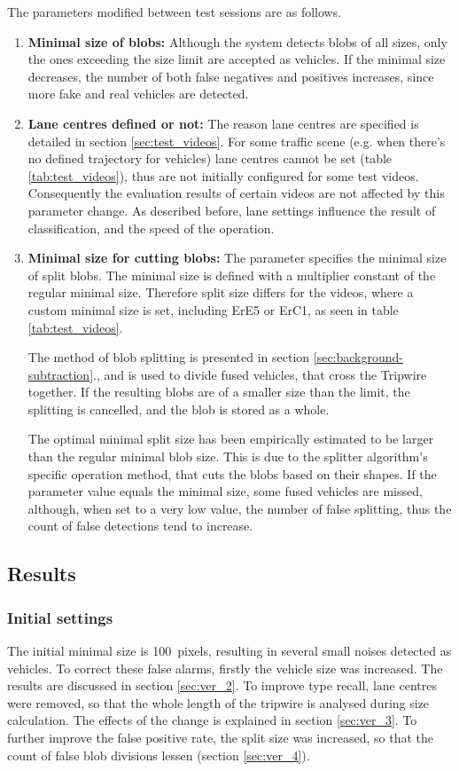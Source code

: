 \noindent The parameters modified between test sessions are as follows.
\begin{enumerate}
	\item \textbf{Minimal size of blobs:} Although the system detects blobs of all sizes, only the ones exceeding the size limit are accepted as vehicles. If the minimal size decreases, the number of both false negatives and positives increases, since more fake and real vehicles are detected.
	
	\item \textbf{Lane centres defined or not:} The reason lane centres are specified is detailed in section \ref{sec:test_videos}. For some traffic scene (e.g. when there's no defined trajectory for vehicles) lane centres cannot be set (table \ref{tab:test_videos}), thus are not initially configured for some test videos. Consequently the evaluation results of certain videos are not affected by this parameter change. As described before, lane settings influence the result of classification, and the speed of the operation.
	
	\item \textbf{Minimal size for cutting blobs:} The parameter specifies the minimal size of split blobs. The minimal size is defined with a multiplier constant of the regular minimal size. Therefore split size differs for the videos, where a custom minimal size is set, including ErE5 or ErC1, as seen in table \ref{tab:test_videos}. 
	
	The method of blob splitting is presented in section \ref{sec:background-subtraction}., and is used to divide fused vehicles, that cross the Tripwire together. If the resulting blobs are of a smaller size than the limit, the splitting is cancelled, and the blob is stored as a whole. 
	
	The optimal minimal split size has been empirically estimated to be larger than the regular minimal blob size. This is due to the splitter algorithm's specific operation method, that cuts the blobs based on their shapes. If the parameter value equals the minimal size, some fused vehicles are missed, although, when set to a very low value, the number of false splitting, thus the count of false detections tend to increase.
\end{enumerate}

\subsection{Results}
\subsubsection{Initial settings}
The initial minimal size is \SI{100}{pixels}, resulting in several small noises detected as vehicles.
To correct these false alarms, firstly the vehicle size was increased.
The results are discussed in section \ref{sec:ver_2}.
To improve type recall, lane centres were removed, so that the whole length of the tripwire is analysed during size calculation. 
The effects of the change is explained in section \ref{sec:ver_3}.
To further improve the false positive rate, the split size was increased, so that the count of false blob divisions lessen (section \ref{sec:ver_4}).

